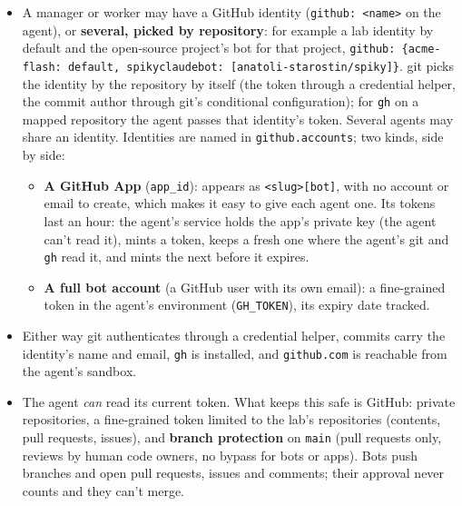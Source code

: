 \documentclass[11pt]{article}
\newcommand{\code}[1]{\texttt{#1}}
\begin{document}
\begin{itemize}
  \item A manager or worker may have a GitHub identity (\code{github: <name>} on the agent),
    or \textbf{several, picked by repository}: for example a lab identity by default
    and the open-source project's bot for that project,
    \code{github: \{acme-flash: default, spikyclaudebot: [anatoli-starostin/spiky]\}}.
    git picks the identity by the repository by itself (the token through a credential
    helper, the commit author through git's conditional configuration); for \code{gh} on a
    mapped repository the agent passes that identity's token. Several agents may share an
    identity. Identities are named in \code{github.accounts}; two kinds, side by side:
    \begin{itemize}
      \item \textbf{A GitHub App} (\code{app\_id}): appears as \code{<slug>[bot]}, with no
        account or email to create, which makes it easy to give each agent one. Its tokens
        last an hour: the agent's service holds the app's private key (the agent can't
        read it), mints a token, keeps a fresh one where the agent's git and \code{gh}
        read it, and mints the next before it expires.
      \item \textbf{A full bot account} (a GitHub user with its own email): a fine-grained
        token in the agent's environment (\code{GH\_TOKEN}), its expiry date tracked.
    \end{itemize}
  \item Either way git authenticates through a credential helper, commits carry the
    identity's name and email, \code{gh} is installed, and \code{github.com} is reachable
    from the agent's sandbox.
  \item The agent \emph{can} read its current token. What keeps this safe is GitHub: private
    repositories, a fine-grained token limited to the lab's repositories (contents, pull
    requests, issues), and \textbf{branch protection} on \code{main} (pull requests only,
    reviews by human code owners, no bypass for bots or apps). Bots push branches and open
    pull requests, issues and comments; their approval never counts and they can't merge.
\end{itemize}

\end{document}
